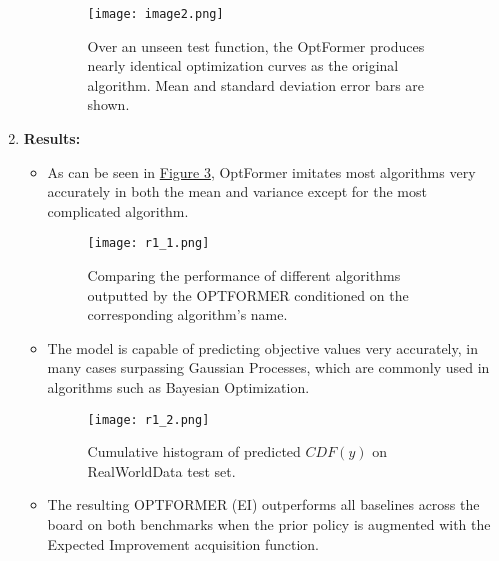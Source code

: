 \documentclass[11pt]{article}
\begin{document}
\begin{enumerate}
\begin{itemize}
        \medskip
        \begin{minipage}{\linewidth}
        \begin{figure}[H]
            \centering
            \texttt{[image: image2.png]}
            \caption{Over an unseen test function, the OptFormer produces nearly identical optimization curves as the original algorithm. Mean and standard deviation error bars are shown.}
            \label{fig:result1}
        \end{figure}
        \end{minipage}
    \end{itemize}
    \item
    \textbf{Results:}   
    \begin{itemize}
        \item As can be seen in \hyperref[fig:imitating]{Figure 3}, OptFormer imitates most algorithms very accurately in both the mean and variance except for the most complicated algorithm.\\
        \medskip
        \begin{minipage}{\linewidth}
        \begin{figure}[H]
            \centering
            \texttt{[image: r1\_1.png]}
            \caption{Comparing the performance of different algorithms outputted by the OPTFORMER conditioned on the corresponding algorithm’s name.}
            \label{fig:imitating}
        \end{figure}
        \end{minipage}
        \item The model is capable of predicting objective values very accurately, in many cases surpassing Gaussian Processes, which are commonly used in algorithms such as Bayesian Optimization.\\
        \medskip
        \begin{minipage}{\linewidth}
        \begin{figure}[H]
            \centering
            \texttt{[image: r1\_2.png]}
            \caption{Cumulative histogram of predicted $CDF(y)$ on RealWorldData test set.}
            \label{fig:my_label}
        \end{figure}
        \end{minipage}
        \item The resulting OPTFORMER (EI) outperforms all baselines across the board on both benchmarks when the prior policy is augmented with the Expected Improvement acquisition function.\\

\end{itemize}
\end{enumerate}
\end{document}
